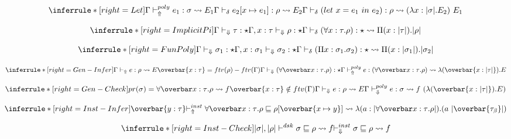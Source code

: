 \[
\inferrule*[right=Let]
{\polyinfer e_1 : \sigma \transto{E_1}\\
\infercheck e_2[\tpmapsto \sigma x {e_1}]: \rho \transto{E_2}
}
{\infercheck ( let\ x = e_1\ in\ e_2 ) : \rho \transto{(\lambda x:\translated \sigma. E_2)\ E_1}}
\]


\[
\inferrule*[right=ImplicitPi]
{\checktype \tau : \star \\ \Gamma, x:\tau \checktypeno \rho : \star}
{\infercheck (\forall x : \tau. \rho) : \star \transto {\Pi (x:\translated \tau). \translated \rho}}
\]


\[
\inferrule*[right=FunPoly]
{\checktype \sigma_1 : \star \\
\Gamma, x:\sigma_1 \checktypeno \sigma_2 : \star }
{\infercheck (\Pi x : \sigma_1. \sigma_2) : \star \transto{\Pi (x:\translated {\sigma_1}). \translated {\sigma_2}}}
\]


\[
\inferrule*[right=Gen-Infer]
{\infertype e :\rho \transto{E} \\ \overbar{x:\tau}=ftv(\rho)-ftv(\Gamma) \\
\checktype (\forallvars{x:\tau}. \rho):\star } {\polyinfer e :(\forallvars{x:\tau}. \rho) \transto{\lambda (\overbar{x:\translated \tau}). E}}
\]

\[
\inferrule*[right=Gen-Check]
{
pr(\sigma) = \forallvars{x:\tau}. \rho \transto{f} \\
\overbar{x:\tau} \notin ftv(\Gamma) \\
\checktype e :\rho \transto{E}
} {\polycheck e : \sigma \transto{f\ (\lambda (\overbar{x:\translated \tau}). E)}}
\]


\[
\inferrule*[right=Inst-Infer]
{\overbar{y : \tau}
}
{\instinfer \forallvars{x:\tau} . \rho \sqsubseteq \rho[\overbar{\tpmapsto \tau x y}] \transto
{\lambda (a: \translated{\forallvars{x:\tau} . \rho} ). (a\ \translated{\overbar{\tau_{\beta}}})}}
\]

\[
\inferrule*[right=Inst-Check]
{\translated{\sigma}, \translated{\rho}\dsk \sigma \sqsubseteq \rho \transto {f} \\
}
{\instcheck \sigma \sqsubseteq \rho \transto {f}}
\]

